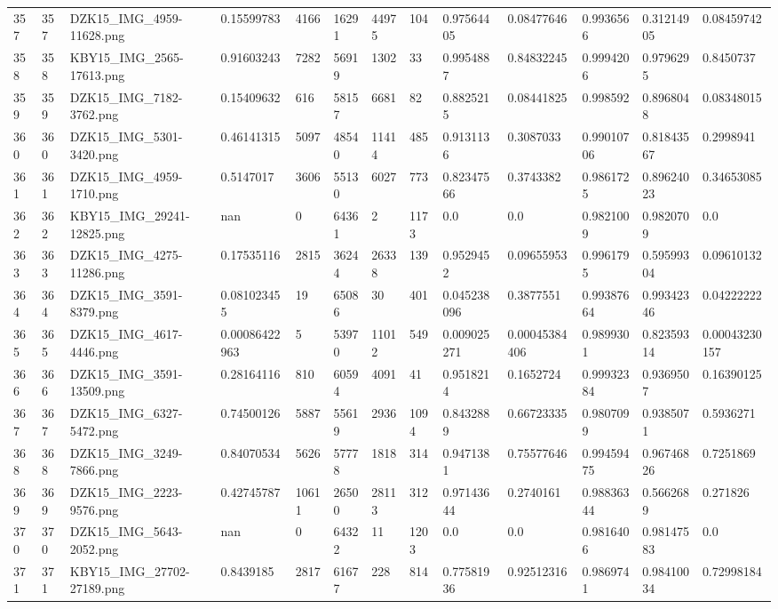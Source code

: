 \documentclass[11pt, a4paper, twoside]{report}
\begin{document}
\begin{longtable}[c]{@{}lllllllllllll@{}}
357 & 357 & DZK15\_IMG\_4959-11628.png & 0.15599783 & 4166 & 16291 & 44975 & 104 & 0.97564405 & 0.08477646 & 0.9936566 & 0.31214905 & 0.08459742 \\
358 & 358 & KBY15\_IMG\_2565-17613.png & 0.91603243 & 7282 & 56919 & 1302 & 33 & 0.9954887 & 0.84832245 & 0.9994206 & 0.9796295 & 0.8450737 \\
359 & 359 & DZK15\_IMG\_7182-3762.png & 0.15409632 & 616 & 58157 & 6681 & 82 & 0.8825215 & 0.08441825 & 0.998592 & 0.8968048 & 0.08348015 \\
360 & 360 & DZK15\_IMG\_5301-3420.png & 0.46141315 & 5097 & 48540 & 11414 & 485 & 0.9131136 & 0.3087033 & 0.99010706 & 0.81843567 & 0.2998941 \\
361 & 361 & DZK15\_IMG\_4959-1710.png & 0.5147017 & 3606 & 55130 & 6027 & 773 & 0.82347566 & 0.3743382 & 0.9861725 & 0.89624023 & 0.34653085 \\
362 & 362 & KBY15\_IMG\_29241-12825.png & nan & 0 & 64361 & 2 & 1173 & 0.0 & 0.0 & 0.9821009 & 0.9820709 & 0.0 \\
363 & 363 & DZK15\_IMG\_4275-11286.png & 0.17535116 & 2815 & 36244 & 26338 & 139 & 0.9529452 & 0.09655953 & 0.9961795 & 0.59599304 & 0.09610132 \\
364 & 364 & DZK15\_IMG\_3591-8379.png & 0.081023455 & 19 & 65086 & 30 & 401 & 0.045238096 & 0.3877551 & 0.99387664 & 0.99342346 & 0.04222222 \\
365 & 365 & DZK15\_IMG\_4617-4446.png & 0.00086422963 & 5 & 53970 & 11012 & 549 & 0.009025271 & 0.00045384406 & 0.9899301 & 0.82359314 & 0.00043230157 \\
366 & 366 & DZK15\_IMG\_3591-13509.png & 0.28164116 & 810 & 60594 & 4091 & 41 & 0.9518214 & 0.1652724 & 0.99932384 & 0.9369507 & 0.16390125 \\
367 & 367 & DZK15\_IMG\_6327-5472.png & 0.74500126 & 5887 & 55619 & 2936 & 1094 & 0.8432889 & 0.66723335 & 0.9807099 & 0.9385071 & 0.5936271 \\
368 & 368 & DZK15\_IMG\_3249-7866.png & 0.84070534 & 5626 & 57778 & 1818 & 314 & 0.9471381 & 0.75577646 & 0.99459475 & 0.96746826 & 0.7251869 \\
369 & 369 & DZK15\_IMG\_2223-9576.png & 0.42745787 & 10611 & 26500 & 28113 & 312 & 0.97143644 & 0.2740161 & 0.98836344 & 0.5662689 & 0.271826 \\
370 & 370 & DZK15\_IMG\_5643-2052.png & nan & 0 & 64322 & 11 & 1203 & 0.0 & 0.0 & 0.9816406 & 0.98147583 & 0.0 \\
371 & 371 & KBY15\_IMG\_27702-27189.png & 0.8439185 & 2817 & 61677 & 228 & 814 & 0.77581936 & 0.92512316 & 0.9869741 & 0.98410034 & 0.72998184 \\

\end{longtable}
\end{document}
